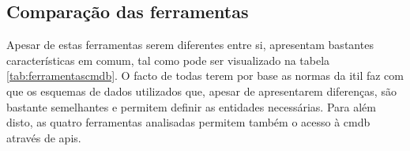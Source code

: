 \documentclass[
  oneside,
  11pt, a4paper,
  footinclude=true,
  headinclude=true,
  cleardoublepage=empty
]{scrbook}
\begin{document}

\subsection{Comparação das ferramentas}

\renewcommand{\arraystretch}{2}

Apesar de estas ferramentas serem diferentes entre si, apresentam bastantes características em comum, tal como pode ser visualizado na tabela \ref{tab:ferramentascmdb}. O facto de todas terem por base as normas da \gls{itil} faz com que os esquemas de dados utilizados que, apesar de apresentarem diferenças, são bastante semelhantes e permitem definir as entidades necessárias. Para além disto, as quatro ferramentas analisadas permitem também o acesso à \gls{cmdb} através de \glspl{api}.
\end{document}
